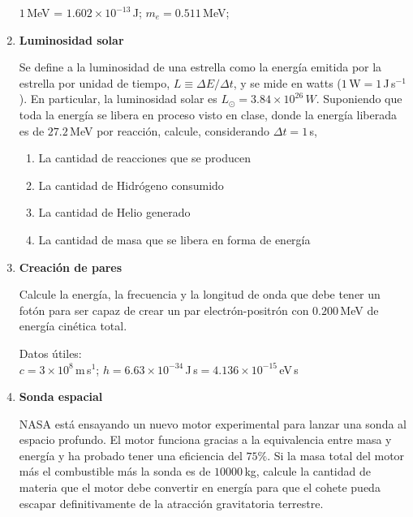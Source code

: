 \documentclass[a4paper,12pt]{article}
\begin{document}
\begin{enumerate}
$1$\,MeV = $1.602\times10^{-13}$\,J; $m_e=0.511$\,MeV;

\item {\bf{Luminosidad solar}}

Se define a la luminosidad de una estrella como la energía emitida por la
estrella por unidad de tiempo, $L \equiv \Delta E/\Delta t$, y se mide en watts
($1$\,W$=1$\,J\,s$^{-1}$). En particular, la luminosidad solar es $L_\odot =
3.84\times 10^{26}\,W$. Suponiendo que toda la energía se libera en proceso
visto en clase, donde la energía liberada es de $27.2$\,MeV por reacción,
calcule, considerando $\Delta t=1$\,s, 
\begin{enumerate}
\item La cantidad de reacciones que se producen
\item La cantidad de Hidrógeno consumido
\item La cantidad de Helio generado
\item La cantidad de masa que se libera en forma de energía
\end{enumerate}

\item {\bf{Creación de pares}}

Calcule la energía, la frecuencia y la longitud de onda que debe tener un fotón
para ser capaz de crear un par electrón-positrón con $0.200$\,MeV de energía
cinética total.

Datos útiles:\\
$c=3\times10^8$\,m\,s$^{1}$;
$h=6.63\times10^{-34}$\,J\,s$=4.136\times10^{-15}$\,eV\,s

\item {\bf{Sonda espacial}}

NASA está ensayando un nuevo motor experimental para lanzar una sonda al
espacio profundo. El motor funciona gracias a la equivalencia entre masa y
energía y ha probado tener una eficiencia del $75\%$. Si la masa total del
motor más el combustible más la sonda es de $10000$\,kg, calcule la cantidad de
materia que el motor debe convertir en energía para que el cohete pueda escapar
definitivamente de la atracción gravitatoria terrestre.


\end{enumerate}
\end{document}
